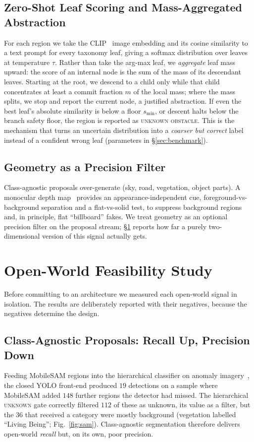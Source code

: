 \documentclass[conference]{IEEEtran}
\begin{document}
\subsection{Zero-Shot Leaf Scoring and Mass-Aggregated Abstraction}
For each region we take the CLIP~\cite{radford2021} image embedding and its cosine
similarity to a text prompt for every taxonomy leaf, giving a softmax distribution
over leaves at temperature $\tau$. Rather than take the arg-max leaf, we
\emph{aggregate} leaf mass upward: the score of an internal node is the sum of the
mass of its descendant leaves. Starting at the root, we descend to a child only
while that child concentrates at least a commit fraction $m$ of the local mass;
where the mass splits, we stop and report the current node, a justified
abstraction. If even the best leaf's absolute similarity is below a floor
$s_{\min}$, or descent halts below the branch safety floor, the region is reported
as \textsc{unknown obstacle}. This is the mechanism that turns an uncertain
distribution into a \emph{coarser but correct} label instead of a confident wrong
leaf (parameters in \S\ref{sec:benchmark}).

\subsection{Geometry as a Precision Filter}
Class-agnostic proposals over-generate (sky, road, vegetation, object parts). A
monocular depth map~\cite{yang2024depthanything} provides an appearance-independent
cue, foreground-vs-background separation and a flat-vs-solid test, to suppress
background regions and, in principle, flat ``billboard'' fakes. We treat geometry
as an optional precision filter on the proposal stream; \S\ref{sec:feasibility}
reports how far a purely two-dimensional version of this signal actually gets.

\section{Open-World Feasibility Study}
\label{sec:feasibility}
Before committing to an architecture we measured each open-world signal in
isolation. The results are deliberately reported with their negatives, because the
negatives determine the design.

\subsection{Class-Agnostic Proposals: Recall Up, Precision Down}
Feeding MobileSAM regions into the hierarchical classifier on anomaly
imagery~\cite{chan2021}, the closed YOLO front-end produced $19$ detections on a
sample where MobileSAM added $148$ further regions the detector had missed. The
hierarchical \textsc{unknown} gate correctly filtered $112$ of these as unknown, its
value as a filter, but the $36$ that received a category were mostly background
(vegetation labelled ``Living Being''; Fig.~\ref{fig:sam}). Class-agnostic
segmentation therefore delivers open-world \emph{recall} but, on its own, poor
precision.
\end{document}
